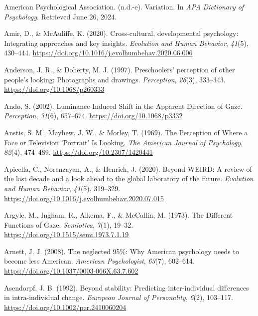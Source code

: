 \documentclass[
]{scrbook}
\newlength{\cslhangindent}
\newenvironment{CSLReferences}[2] %
 {\begin{list}{}{%
  \setlength{\itemindent}{0pt}
  \setlength{\leftmargin}{0pt}
  \setlength{\parsep}{0pt}
  \ifodd #1
   \setlength{\leftmargin}{\cslhangindent}
   \setlength{\itemindent}{-1\cslhangindent}
  \fi
  \setlength{\itemsep}{#2\baselineskip}}}
 {\end{list}}
\begin{document}
\begin{CSLReferences}{1}{0}
American Psychological Association. (n.d.-e). Variation. In \emph{APA Dictionary of Psychology}. Retrieved June 26, 2024.

Amir, D., \& McAuliffe, K. (2020). Cross-cultural, developmental psychology: Integrating approaches and key insights. \emph{Evolution and Human Behavior}, \emph{41}(5), 430--444. \url{https://doi.org/10.1016/j.evolhumbehav.2020.06.006}

Anderson, J. R., \& Doherty, M. J. (1997). Preschoolers' perception of other people's looking: {Photographs} and drawings. \emph{Perception}, \emph{26}(3), 333--343. \url{https://doi.org/10.1068/p260333}

Ando, S. (2002). Luminance-{Induced Shift} in the {Apparent Direction} of {Gaze}. \emph{Perception}, \emph{31}(6), 657--674. \url{https://doi.org/10.1068/p3332}

Anstis, S. M., Mayhew, J. W., \& Morley, T. (1969). The {Perception} of {Where} a {Face} or {Television} '{Portrait}' {Is Looking}. \emph{The American Journal of Psychology}, \emph{82}(4), 474--489. \url{https://doi.org/10.2307/1420441}

Apicella, C., Norenzayan, A., \& Henrich, J. (2020). Beyond {WEIRD}: {A} review of the last decade and a look ahead to the global laboratory of the future. \emph{Evolution and Human Behavior}, \emph{41}(5), 319--329. \url{https://doi.org/10.1016/j.evolhumbehav.2020.07.015}

Argyle, M., Ingham, R., Alkema, F., \& McCallin, M. (1973). The {Different Functions} of {Gaze}. \emph{Semiotica}, \emph{7}(1), 19--32. \url{https://doi.org/10.1515/semi.1973.7.1.19}

Arnett, J. J. (2008). The neglected 95\%: {Why American} psychology needs to become less {American}. \emph{American Psychologist}, \emph{63}(7), 602--614. \url{https://doi.org/10.1037/0003-066X.63.7.602}

Asendorpf, J. B. (1992). Beyond stability: {Predicting} inter-individual differences in intra-individual change. \emph{European Journal of Personality}, \emph{6}(2), 103--117. \url{https://doi.org/10.1002/per.2410060204}


\end{CSLReferences}
\end{document}
